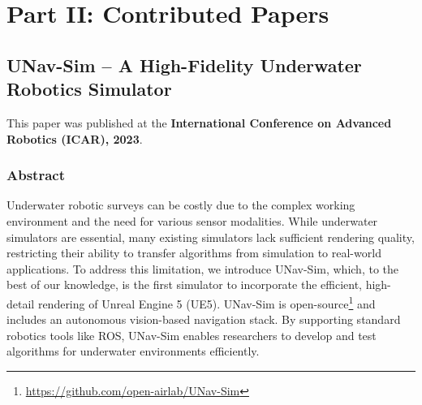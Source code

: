 \documentclass[
10pt, %
b5paper, %
twoside, %
openright  %
]{book}  %
\begin{document}
 
 
 
 
 


 
 
  

%
%
%

% 




\part*{Part II: Contributed Papers}
 \label{partII:paper}



\chapter{UNav-Sim – A High-Fidelity Underwater Robotics Simulator}
\vspace{1cm}
This paper was published at the \textbf{International Conference on Advanced Robotics (ICAR), 2023}.

 \section{Abstract}
Underwater robotic surveys can be costly due to the complex working environment and the need for various sensor modalities. While underwater simulators are essential, many existing simulators lack sufficient rendering quality, restricting their ability to transfer algorithms from simulation to real-world applications. To address this limitation, we introduce UNav-Sim, which, to the best of our knowledge, is the first simulator to incorporate the efficient, high-detail rendering of Unreal Engine 5 (UE5). UNav-Sim is open-source\footnote{\url{https://github.com/open-airlab/UNav-Sim}} and includes an autonomous vision-based navigation stack. By supporting standard robotics tools like ROS, UNav-Sim enables researchers to develop and test algorithms for underwater environments efficiently.
\end{document}
